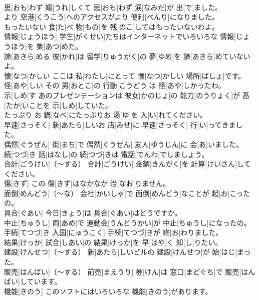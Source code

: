 \documentclass[8pt]{extreport}
\begin{document}
\begin{CJK}{UTF8}{min}
\\	思[おも]わず	嬉[うれ]しくて 思[おも]わず 涙[なみだ]が 出[で]ました。		
\\	より	空港[くうこう]へのアクセスがより 便利[べんり]になりました。		
\\	もったいない	食[た]べ 物[もの]を 残[のこ]してはもったいないわよ。		
\\	情報[じょうほう]	学生[がくせい]たちはインターネットでいろいろな 情報[じょうほう]を 集[あつ]めた。		
\\	諦[あきら]める	彼[かれ]は 留学[りゅうがく]の 夢[ゆめ]を 諦[あきら]めていないよ。		
\\	懐[なつ]かしい	ここは 私[わたし]にとって 懐[なつ]かしい 場所[ばしょ]です。		
\\	怪[あや]しい	その 男[おとこ]の 行動[こうどう]は 怪[あや]しかったわ。		
\\	示[しめ]す	あのプレゼンテーションは 彼女[かのじょ]の 能力[のうりょく]が 高[たか]いことを 示[しめ]していた。		
\\	たっぷり	お 鍋[なべ]にたっぷりお 湯[ゆ]を 入[い]れてください。		
\\	早速[さっそく]	新[あたら]しいお 店[みせ]に 早速[さっそく] 行[い]ってきました。		
\\	偶然[ぐうぜん]	街[まち]で 偶然[ぐうぜん] 友人[ゆうじん]に 会[あ]いました。		
\\	続[つづ]き	話[はなし]の 続[つづ]きは 電話[でんわ]でしましょう。		
\\	合計[ごうけい]（～する）	合計[ごうけい] 金額[きんがく]を 計算[けいさん]してください。		
\\	傷[きず]	この 傷[きず]はなかなか 治[なお]りません。		
\\	面倒[めんどう]（～な）	会社[かいしゃ]で 面倒[めんどう]なことが 起[お]こったの。		
\\	具合[ぐあい]	今日[きょう]は 具合[ぐあい]はどうですか。		
\\	中止[ちゅうし]	雨[あめ]で 運動会[うんどうかい]が 中止[ちゅうし]になったの。		
\\	手続[てつづ]き	入国[にゅうこく] 手続[てつづ]きが 終[お]わりました。		
\\	結果[けっか]	試合[しあい]の 結果[けっか]を 早[はや]く 知[し]りたい。		
\\	建設[けんせつ]（～する）	新[あたら]しいビルの 建設[けんせつ]が 始[はじ]まった。		
\\	販売[はんばい]（～する）	前売[まえうり] 券[けん]は 窓口[まどぐち]で 販売[はんばい]しています。		
\\	機能[きのう]	このソフトにはいろいろな 機能[きのう]があります。		

\end{CJK}
\end{document}
